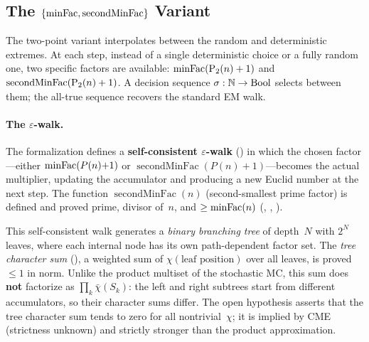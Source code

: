 \subsection{The $\{\mathrm{minFac}, \operatorname{secondMinFac}\}$ Variant}
\label{sec:minfac-secondminfac}

The two-point variant interpolates between the random and deterministic
extremes.  At each step, instead of a single deterministic choice or a
fully random one, two specific factors are available:
$\mathrm{minFac}(\mathrm{P}_{2}(n)+1)$ and $\operatorname{secondMinFac}(\mathrm{P}_{2}(n)+1)$.
A decision sequence $\sigma : \mathbb{N} \to \mathrm{Bool}$ selects between
them; the all-true sequence recovers the standard EM walk.

\paragraph{The $\varepsilon$-walk.}
The formalization defines a
\textbf{self-consistent $\varepsilon$-walk}
()
in which the chosen factor---either $\mathrm{minFac}(P(n){+}1)$ or
$\operatorname{secondMinFac}(P(n){+}1)$---becomes the actual multiplier,
updating the accumulator and producing a new Euclid number at the next
step.
The function $\operatorname{secondMinFac}(n)$ (second-smallest prime
factor) is defined and proved prime, divisor of~$n$, and
$\geq \mathrm{minFac}(n)$
(,
,
).

This self-consistent walk generates a \emph{binary branching tree}
of depth~$N$ with $2^N$ leaves, where each internal node has its own
path-dependent factor set.  The \emph{tree character sum}
(),
a weighted sum of $\chi(\text{leaf position})$ over all leaves, is proved
$\leq 1$ in norm.  Unlike the product multiset of the stochastic MC, this sum
does \textbf{not} factorize as $\prod_k \bar\chi(S_k)$: the left and
right subtrees start from different accumulators, so their character sums
differ.  The open hypothesis
asserts that the tree character sum tends to zero for all nontrivial~$\chi$;
it is implied by CME (strictness unknown) and strictly stronger than the product approximation.

